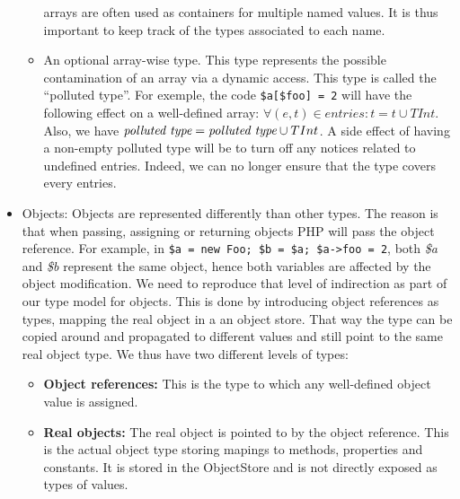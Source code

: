 \documentclass[a4paper]{article}
\begin{document}
\begin{itemize}
\begin{itemize}
          arrays are often used as containers for multiple named values. It is
          thus important to keep track of the types associated to each name.
        \item An optional array-wise type. This type represents the possible 
          contamination of an array via a dynamic access. This type is called
          the ``polluted type''. For exemple, the code
          \verb/$a[$foo] = 2/ will have the following effect on a well-defined
          array: $\forall (e, t) \in entries: t = t \cup TInt$. Also, we have
          $\emph{polluted type} = \emph{polluted type} \cup TInt$. A side
          effect of having a non-empty polluted type will be to turn off any
          notices related to undefined entries. Indeed, we can no longer ensure
          that the type covers every entries.
    \end{itemize}
  \item Objects: Objects are represented differently than other types. The
    reason is that when passing, assigning or returning objects PHP will pass
    the object reference. For example, in 
    \verb/$a = new Foo; $b = $a; $a->foo = 2/, both \emph{\$a} and \emph{\$b}
    represent the same object, hence both variables are affected by the object
    modification. We need to reproduce that level of indirection as part of our
    type model for objects. This is done by introducing object references as
    types, mapping the real object in a an object store. That way the type can
    be copied around and propagated to different values and still point to the
    same real object type. We thus have two different levels of types:
    \begin{itemize}
          \item \textbf{Object references:} This is the type to which
            any well-defined object value is assigned.
          \item \textbf{Real objects:} The real object is pointed to by the
            object reference. This is the actual object type storing mapings to
            methods, properties and constants. It is stored in the ObjectStore
            and is not directly exposed as types of values.
    \end{itemize}


\end{itemize}
\end{document}
